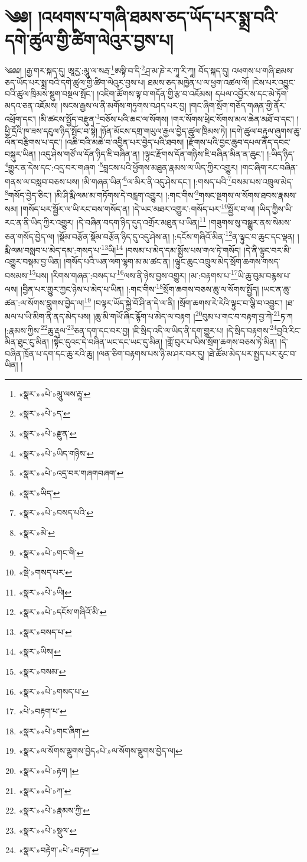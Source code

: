 \chapter{༄༅། །འཕགས་པ་གཞི་ཐམས་ཅད་ཡོད་པར་སྨྲ་བའི་དགེ་ཚུལ་གྱི་ཚིག་ལེའུར་བྱས་པ།}༄༅༅། །རྒྱ་གར་སྐད་དུ། ཨཱརྱ་:མཱུ་ལ་སརྦ་\footnote{«སྣར་»«པེ་»མཱུ་ལས་རྦཱ་}ཨསྟི་བ་དི་\footnote{«སྣར་»«པེ་»ད་}ཤྲ་མ་ཎེ་ར་ཀཱ་རི་ཀཱ། བོད་སྐད་དུ། འཕགས་པ་གཞི་ཐམས་ཅད་ཡོད་པར་སྨྲ་བའི་དགེ་ཚུལ་གྱི་ཚིག་ལེའུར་བྱས་པ། ཐམས་ཅད་མཁྱེན་པ་ལ་ཕྱག་འཚལ་ལོ། །ངེས་པར་འབྱུང་བའི་ཚུལ་ཁྲིམས་སྡུག་བསྔལ་སྤོང་། །འཇིག་ཚོགས་ལྟ་བ་གདོན་གྱི་རྩ་བ་འཇོམས། དཔལ་འབྱོར་ས་དང་མེ་ཏོག་མདའ་ཅན་འཇོམས། །སངས་རྒྱས་ལ་ནི་མགོས་གཏུགས་བཤད་པར་བྱ། །གང་ཞིག་སྲོག་གཅོད་གཞན་གྱི་ནོར་འཕྲོག་དང་། །མི་ཚངས་སྤྱོད་བརྫུན་\footnote{«སྣར་»«པེ་»རྫུན་}བཅོས་པའི་ཆང་ལ་སོགས། །གར་སོགས་ཕྲེང་སོགས་མལ་ཆེན་མཐོ་བ་དང་། །ཕྱི་དྲོའི་ཁ་ཟས་དངུལ་ཉིད་སྤོང་བ་སྟེ། །ཉོན་མོངས་དགྲ་གཡུལ་རྒྱལ་བྱེད་ཚུལ་ཁྲིམས་ཏེ། །དགེ་ཚུལ་བརྟུལ་ཞུགས་ཆུ་ལོན་བརྩིགས་པ་དང་། །འཆི་བའི་མཆེ་བ་འབྱིན་པར་བྱེད་པའི་ཐབས། །རྫོགས་པའི་བྱང་ཆུབ་དཔལ་ནོད་དབང་བསྐུར་ཡིན། །འདུ་ཤེས་གཙོ་ལ་དོན་ཉིད་ཇི་བཞིན་ན། །ལྟུང་རྫོགས་དོན་གཉིས་ཇི་བཞིན་མིན་ན་ཆུང་། །:ཡིད་ཉིད་\footnote{«སྣར་»«པེ་»ཡིད་གཉིས་}གྱུར་ན་དེས་དང་:འདྲ་བར་གཞག ་\footnote{«སྣར་»«པེ་»འདྲ་བར་གཞགབཞག་}བླངས་པའི་ཕྱོགས་མཐུན་རྣམས་ལ་ཡིད་ཀྱིར་འགྱུར། །གང་ཞིག་རང་བཞིན་གནས་ལ་བསླབ་བཅས་པས། །མི་གཞན་ཡིན་\footnote{«སྣར་»ཡིད་}ལ་མིར་ནི་འདུ་ཤེས་དང་། །:གསད་པའི་\footnote{«སྣར་»«པེ་»བསད་པའི་}བསམ་པས་འཁྲུལ་མེད་\footnote{«སྣར་»མེ་}གསོད་བྱེད་ཅིང་། །མི་ཤི་རྨི་ལམ་མ་གཏོགས་དེ་བརླག་འགྱུར། །:གང་གིས་\footnote{«སྣར་»«པེ་»གང་གི་}གསང་སྔགས་ལ་སོགས་ཐབས་རྣམས་སམ། །གསོད་པར་སྦྱོར་ལ་ཡི་རང་བས་གསོད་ན། །དེ་ཡང་མཐར་འགྱུར་:གསོད་པར་\footnote{«སྡེ་»གསད་པར་}སྦྱོར་བ་ལ། །ཡིད་ཀྱིས་ཡི་རང་ན་ནི་ཡིད་ཀྱིར་འགྱུར། །དེ་བཞིན་བདག་ཉིད་དུད་འགྲོར་མཐུན་པ་ཡིན།\footnote{«སྣར་»«པེ་»ཡི།} །གཟུགས་སུ་བསྒྱུར་ནས་སེམས་ཅན་གསོད་བྱེད་ལ། །སྡོམ་བརྩོན་སྡོམ་བརྩོན་ཉིད་དུ་འདུ་ཤེས་ན། །:དངོས་གཞིའོ་མིན་\footnote{«སྣར་»«པེ་»དངོས་གཞིའོ་མི་}ན་ལྟུང་བ་ཆུང་དང་ལྡན། །རྨི་ལམ་བསླབ་པ་མེད་དམ་:གསད་པ་\footnote{«སྣར་»བསད་པ་}ཡི།\footnote{«སྣར་»ཡིས།} །བསམ་པ་མེད་དམ་སྨྱོས་པས་གལ་ཏེ་གསོད། །དེ་ནི་ལྟུང་བར་མི་འགྱུར་བསྡམ་བྱ་ཡིན། །གསོད་པའི་ཡན་ལག་ལྷག་མ་མ་ཚང་ན། །ལྟུང་ཆུང་འཁྲུལ་མེད་སྲོག་ཆགས་གསད་བསམས་\footnote{«སྣར་»བསམ་}པས། །རིགས་གཞན་:བསད་པ་\footnote{«སྣར་»«པེ་»གསད་པ་}ལས་ནི་ཉེས་བྱས་འགྱུར། །མ་:བརྟགས་པ་\footnote{«པེ་»བརྟག་པ་}ཡི་ཆུ་བུམ་བརྙས་པ་ལས། །བྱིན་པར་གྱུར་ཀྱང་ཉེས་པ་མེད་པ་ཡིན། །:གང་གིས་\footnote{«སྣར་»«པེ་»གང་ཞིག་}སྲོག་ཆགས་བཅས་ཆུ་ལ་སོགས་སྤྱོད། །ཡང་ན་ཆུ་ཚན་:ལ་སོགས་བླུགས་བྱེད་ལ།\footnote{«སྣར་»ལ་སོགས་ལྡུགས་བྱེད«པེ་»ལ་སོགས་ལྡུགས་བྱེད་ལ།} །བལྟར་ཡོད་སྐྱེ་བོ་ཤི་ན་དེ་ལ་ནི། །སྲོག་ཆགས་རེ་རེའི་ལྟུང་བ་ལྕི་བ་འབྱུང་། །ཐ་མལ་པ་ཡི་མིག་ནི་ནད་མེད་པས། །ཆུ་མི་གཡོ་ཞིང་རྙོག་པ་མེད་ལ་བརྟག །\footnote{«སྣར་»«པེ་»རྟག །}བུམ་པ་གང་བ་བརྟག་བྱ་ཀེ་\footnote{«སྣར་»«པེ་»ཀ་}ཏ་ཀ །:རྣམས་ཀྱིས་\footnote{«སྣར་»«པེ་»རྣམས་ཀྱི་}ཆུ་རྡུལ་\footnote{«སྣར་»«པེ་»སྡུལ་}ཅན་དག་དང་བར་བྱ། །ཇི་སྲིད་འདི་ལ་ཡིད་ནི་དག་གྱུར་པ། །དེ་སྲིད་བརྟགས་\footnote{«སྣར་»བརྟེག་«པེ་»བརྟག་}བྱའི་རིང་མིན་ཐུང་ངུ་མིན། །སྟེང་དུའང་དེ་བཞིན་ཡང་དང་ཡང་དུ་མིན། །གློ་བུར་པ་ཡིས་སྲོག་ཆགས་བཅས་ཏེ་མིན། །དེ་བཞིན་ཁྲོན་པ་དག་དང་ཆུ་རའི་ཆུ། །ལན་ཅིག་བརྟགས་པས་ཉི་མ་ཤར་བར་དུ། །ཐེ་ཚོམ་མེད་པར་སྤྱད་པར་རུང་བ་ཡིན། །
